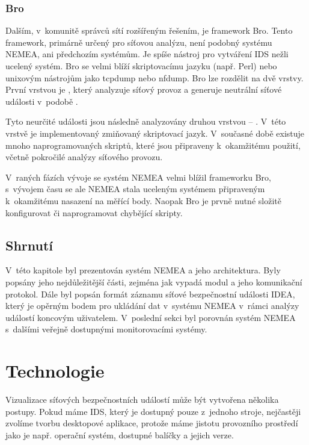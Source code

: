 \subsection*{Bro}
Dalším, v~komunitě správců sítí rozšířeným řešením, je framework Bro. Tento framework, primárně určený pro síťovou analýzu, není podobný systému NEMEA, ani předchozím systémům. Je spíše nástroj pro vytváření IDS nežli ucelený systém. Bro se velmi blíží skriptovacímu jazyku (např. Perl) nebo unixovým nástrojům jako tcpdump nebo nfdump. Bro lze rozdělit na dvě vrstvy. První vrstvou je , který analyzuje síťový provoz a generuje neutrální síťové události v~podobě . 

Tyto neurčité události jsou následně analyzovány druhou vrstvou -- . V~této vrstvě je implementovaný zmiňovaný skriptovací jazyk. V~současné době existuje mnoho naprogramovaných skriptů, které jsou připraveny k~okamžitému použití, včetně pokročilé analýzy síťového provozu.

V~raných fázích vývoje se systém NEMEA velmi blížil frameworku Bro, s~vývojem času se ale NEMEA stala uceleným systémem připraveným k~okamžitému nasazení na měřící body. Naopak Bro je prvně nutné složitě konfigurovat či naprogramovat chybějící skripty. 

\section{Shrnutí}

V~této kapitole byl prezentován systém NEMEA a jeho architektura. Byly popsány jeho nejdůležitější části, zejména jak vypadá modul a jeho komunikační protokol. Dále byl popsán formát záznamu síťové bezpečnostní události IDEA, který je opěrným bodem pro ukládání dat v~systému NEMEA v~rámci analýzy událostí koncovým uživatelem. V~poslední sekci byl porovnán systém NEMEA s~dalšími veřejně dostupnými monitorovacími systémy.


\chapter{Technologie}

Vizualizace síťových bezpečnostních událostí může být vytvořena několika postupy. Pokud máme IDS, který je dostupný pouze z~jednoho stroje, nejčastěji zvolíme tvorbu desktopové aplikace, protože máme jistotu provozního prostředí jako je např. operační systém, dostupné balíčky a jejich verze. 

